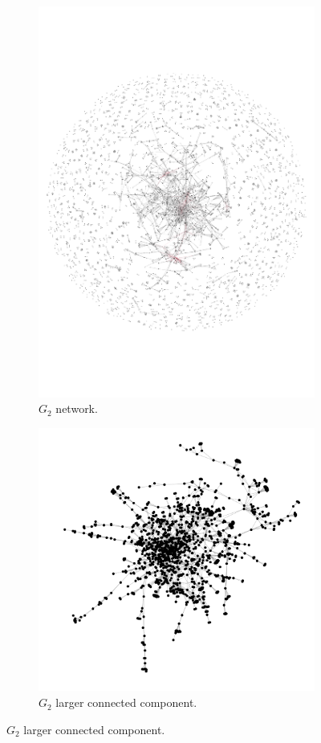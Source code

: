 \documentclass{article}
\theoremstyle{definition}
\begin{document}
\begin{figure}[!hbtp]
     \begin{subfigure}{.45\textwidth}\centering
        \includegraphics[width=.54\textwidth]{./assets/images/auction.pdf}
        \caption{\(G_2\) network.}\label{fig:g_two}
     \end{subfigure}
    \begin{subfigure}{.45\textwidth}\centering
        \includegraphics[width=.54\textwidth]{./assets/images/auction_network_cluster.pdf}
        \caption{\(G_2\) larger connected component.}\label{fig:g_two_cluster}
    \end{subfigure}


\end{figure}
\end{document}
